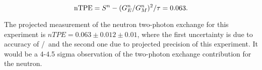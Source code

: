 \begin{equation}
  {\rm nTPE} = S^n - (G_E^n/G_M^n)^2/\tau = 0.063.
\end{equation}

The projected measurement of the neutron two-photon exchange for this experiment is $nTPE = 0.063 \pm 0.012 \pm 0.01$, where the first uncertainty is due to accuracy 
of \gen/\gmn~and the second one due to projected precision of this experiment. It would be a 4-4.5 sigma observation of the two-photon exchange contribution for the neutron.
